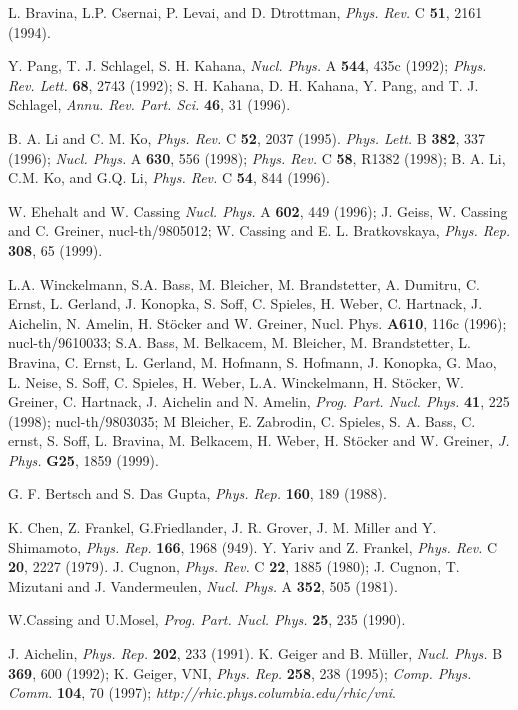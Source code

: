 \documentclass[]{article}
\def\Journal#1#2#3#4{{#1} {\bf #2}, #3 (#4)}
\def\NPA{{\em Nucl. Phys.} A}
\def\NPB{{\em Nucl. Phys.} B}
\def\PLB{{\em Phys. Lett.}  B}
\def\PRL{\em Phys. Rev. Lett.}
\def\PR{{\em Phys. Rev.}}
\def\PRC{{\em Phys. Rev.} C}
\def\PR{{\em Phys. Rep.}}
\def\CPC{{\em Comp. Phys. Comm.}}
\def\ARPS{{\em Annu. Rev. Part. Sci.}}
\def\PPNP{{\em Prog. Part. Nucl. Phys.}}
\def\JP{{\em J. Phys.}}
\begin{document}
\begin{thebibliography}{20}
L. Bravina, L.P. Csernai, P. Levai, and D. Dtrottman,
  \Journal{\PRC}{51}{2161}{1994}.

Y. Pang, T. J. Schlagel, S. H. Kahana,
   \Journal{\NPA}{544}{435c}{1992};
   \Journal{\PRL}{68}{2743}{1992};
 S. H. Kahana, D. H. Kahana, Y. Pang, and T. J. Schlagel,
  \Journal{\ARPS}{46}{31}{1996}.
 

  B. A. Li and C. M. Ko,  \Journal{\PRC}{52}{2037}{1995}.
\Journal{\PLB}{382}{337}{1996};
\Journal{\NPA}{630}{556}{1998};
\Journal{\PRC}{58}{R1382}{1998};
B. A. Li, C.M. Ko, and G.Q. Li, \Journal{\PRC}{54}{844}{1996}.

 W. Ehehalt and W. Cassing \Journal{\NPA}{602}{449}{1996};
 J. Geiss, W. Cassing and C. Greiner, nucl-th/9805012;
 W. Cassing and E. L. Bratkovskaya, \Journal{\PR}{308}{65}{1999}.

L.A. Winckelmann, S.A. Bass, M. Bleicher, M. Brandstetter, A. Dumitru,
C. Ernst, L. Gerland, J. Konopka, S. Soff, C. Spieles, H. Weber,
C. Hartnack, J. Aichelin, N. Amelin, H. St\"ocker and W. Greiner,
  Nucl. Phys. {\bf A610}, 116c (1996); nucl-th/9610033;
%
%
S.A. Bass, M. Belkacem, M. Bleicher, M. Brandstetter, L. Bravina, C. Ernst,
L. Gerland, M. Hofmann, S. Hofmann, J. Konopka, G. Mao, L. Neise, S. Soff,
C. Spieles, H. Weber, L.A. Winckelmann, H. St\"ocker, W.  Greiner,
C. Hartnack, J. Aichelin and  N. Amelin,
\Journal{\PPNP}{41}{225}{1998}; nucl-th/9803035;
%
%
M Bleicher, E. Zabrodin, C. Spieles, S. A. Bass, C. ernst,
S. Soff, L. Bravina, M. Belkacem, H. Weber, H. St\"ocker and W. Greiner,
\Journal{\JP}{G25}{1859}{1999}.






        G. F. Bertsch and S. Das Gupta, 
        \Journal{\PR}{160}{189}{1988}.

K. Chen,  Z. Frankel, G.Friedlander, J. R. Grover, J. M. Miller
and Y. Shimamoto, \Journal{\PR}{166}{1968}{949}.
Y. Yariv and Z. Frankel, \Journal{\PRC}{20}{2227}{1979}.
J. Cugnon, \Journal{\PRC}{22}{1885}{1980};
J. Cugnon, T. Mizutani and J. Vandermeulen,
          \Journal{\NPA}{352}{505}{1981}.

	W.Cassing and U.Mosel,
	\Journal{\PPNP}{25}{235}{1990}.

        J. Aichelin, 
        \Journal{\PR}{202}{233}{1991}.
K. Geiger and B. M{\"u}ller, \Journal{\NPB}{369}{600}{1992};
K. Geiger, VNI,
        \Journal{\PR}{258}{238}{1995};
        \Journal{\CPC}{104}{70}{1997};
 {\em http://rhic.phys.columbia.edu/rhic/vni}.


\end{thebibliography}
\end{document}
